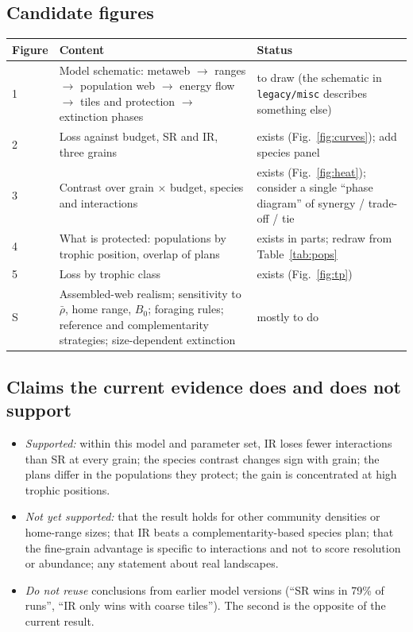 \documentclass[11pt,a4paper]{article}
\newcommand{\code}[1]{\texttt{\small #1}}
\newcommand{\rhobar}{\bar{\rho}}
\begin{document}
\subsection{Candidate figures}
\begin{table}[H]
\small
\begin{tabularx}{\textwidth}{@{}p{1.2cm}L p{4.2cm}@{}}
\toprule
Figure & Content & Status \\
 & Model schematic: metaweb $\rightarrow$ ranges $\rightarrow$ population web $\rightarrow$ energy flow
$\rightarrow$ tiles and protection $\rightarrow$ extinction phases & to draw (the schematic in
\code{legacy/misc} describes something else) \\
2 & Loss against budget, SR and IR, three grains & exists (Fig.~\ref{fig:curves}); add species panel \\
3 & Contrast over grain $\times$ budget, species and interactions & exists (Fig.~\ref{fig:heat}); consider a
single ``phase diagram'' of synergy / trade-off / tie \\
4 & What is protected: populations by trophic position, overlap of plans & exists in parts; redraw from
Table~\ref{tab:pops} \\
5 & Loss by trophic class & exists (Fig.~\ref{fig:tp}) \\
S & Assembled-web realism; sensitivity to $\rhobar$, home range, $B_0$; foraging rules; reference and
complementarity strategies; size-dependent extinction & mostly to do \\
\bottomrule
\end{tabularx}
\end{table}

\subsection{Claims the current evidence does and does not support}
\begin{itemize}
\item \emph{Supported:} within this model and parameter set, IR loses fewer interactions than SR at every
grain; the species contrast changes sign with grain; the plans differ in the populations they protect; the
gain is concentrated at high trophic positions.
\item \emph{Not yet supported:} that the result holds for other community densities or home-range sizes;
that IR beats a complementarity-based species plan; that the fine-grain advantage is specific to
interactions and not to score resolution or abundance; any statement about real landscapes.
\item \emph{Do not reuse} conclusions from earlier model versions (``SR wins in 79\% of runs'', ``IR only
wins with coarse tiles''). The second is the opposite of the current result.
\end{itemize}
\end{document}
